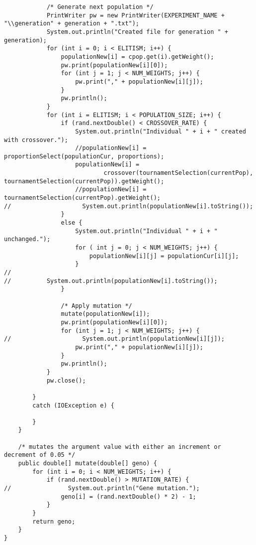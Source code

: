 \documentclass[12pt,a4paper]{article}
\begin{document}
\begin{lstlisting}
            /* Generate next population */
            PrintWriter pw = new PrintWriter(EXPERIMENT_NAME + "\\generation" + generation + ".txt");
            System.out.println("Created file for generation " + generation);
            for (int i = 0; i < ELITISM; i++) {
                populationNew[i] = cpop.get(i).getWeight();
                pw.print(populationNew[i][0]);
                for (int j = 1; j < NUM_WEIGHTS; j++) {
                    pw.print("," + populationNew[i][j]);
                }
                pw.println();
            }
            for (int i = ELITISM; i < POPULATION_SIZE; i++) {
                if (rand.nextDouble() < CROSSOVER_RATE) {
                    System.out.println("Individual " + i + " created with crossover.");
                    //populationNew[i] = proportionSelect(populationCur, proportions);
                    populationNew[i] =
                            crossover(tournamentSelection(currentPop), tournamentSelection(currentPop)).getWeight();
                    //populationNew[i] = tournamentSelection(currentPop).getWeight();
//                    System.out.println(populationNew[i].toString());
                }
                else {
                    System.out.println("Individual " + i + " unchanged.");
                    for ( int j = 0; j < NUM_WEIGHTS; j++) {
                        populationNew[i][j] = populationCur[i][j];
                    }
//
//          System.out.println(populationNew[i].toString());
                }

                /* Apply mutation */
                mutate(populationNew[i]);
                pw.print(populationNew[i][0]);
                for (int j = 1; j < NUM_WEIGHTS; j++) {
//                    System.out.println(populationNew[i][j]);
                    pw.print("," + populationNew[i][j]);
                }
                pw.println();
            }
            pw.close();

        }
        catch (IOException e) {

        }
    }

    /* mutates the argument value with either an increment or decrement of 0.05 */
    public double[] mutate(double[] geno) {
        for (int i = 0; i < NUM_WEIGHTS; i++) {
            if (rand.nextDouble() > MUTATION_RATE) {
//                System.out.println("Gene mutation.");
                geno[i] = (rand.nextDouble() * 2) - 1;
            }
        }
        return geno;
    }
}

\end{lstlisting}
\newpage
\end{document}
